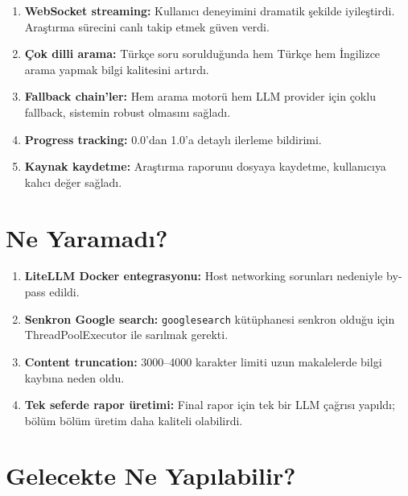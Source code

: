 \begin{enumerate}
  \item \textbf{WebSocket streaming:} Kullan{\i}c{\i} deneyimini dramatik \c{s}ekilde iyile\c{s}tirdi. Ara\c{s}t{\i}rma s\"{u}recini canl{\i} takip etmek g\"{u}ven verdi.
  \item \textbf{\c{C}ok dilli arama:} T\"{u}rk\c{c}e soru soruldu\u{g}unda hem T\"{u}rk\c{c}e hem \.{I}ngilizce arama yapmak bilgi kalitesini art{\i}rd{\i}.
  \item \textbf{Fallback chain'ler:} Hem arama motor\"{u} hem LLM provider i\c{c}in \c{c}oklu fallback, sistemin robust olmas{\i}n{\i} sa\u{g}lad{\i}.
  \item \textbf{Progress tracking:} 0.0'dan 1.0'a detayl{\i} ilerleme bildirimi.
  \item \textbf{Kaynak kaydetme:} Ara\c{s}t{\i}rma raporunu dosyaya kaydetme, kullan{\i}c{\i}ya kal{\i}c{\i} de\u{g}er sa\u{g}lad{\i}.
\end{enumerate}

\section{Ne Yaramad{\i}?}

\begin{enumerate}
  \item \textbf{LiteLLM Docker entegrasyonu:} Host networking sorunlar{\i} nedeniyle by-pass edildi.
  \item \textbf{Senkron Google search:} \texttt{googlesearch} k\"{u}t\"{u}phanesi senkron oldu\u{g}u i\c{c}in ThreadPoolExecutor ile sar{\i}lmak gerekti.
  \item \textbf{Content truncation:} 3000--4000 karakter limiti uzun makalelerde bilgi kayb{\i}na neden oldu.
  \item \textbf{Tek seferde rapor \"{u}retimi:} Final rapor i\c{c}in tek bir LLM \c{c}a\u{g}r{\i}s{\i} yap{\i}ld{\i}; b\"{o}l\"{u}m b\"{o}l\"{u}m \"{u}retim daha kaliteli olabilirdi.
\end{enumerate}

\section{Gelecekte Ne Yap{\i}labilir?}

